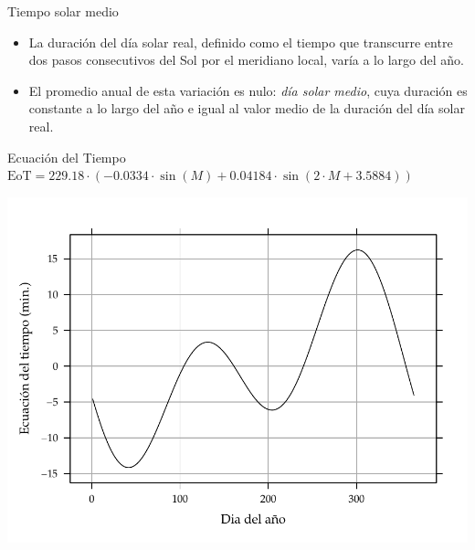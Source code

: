 \documentclass[xcolor={usenames,svgnames,dvipsnames}]{beamer}
\begin{document}
\begin{frame}[label=sec-1-4-3]{Tiempo solar medio}
\begin{itemize}
\item \alert{La duración del día solar real}, definido como el tiempo que
transcurre entre dos pasos consecutivos del Sol por el meridiano
local, \alert{varía a lo largo del año}.

\item El promedio anual de esta variación es nulo: \emph{día solar medio}, cuya
duración es constante a lo largo del año e igual al valor medio de la
duración del día solar real.
\end{itemize}
\end{frame}

\begin{frame}[label=sec-1-4-4]{Ecuación del Tiempo}
$\mathrm{EoT}=229.18\cdot\left(-0.0334\cdot\sin(M)+0.04184\cdot\sin\left(2\cdot
      M+3.5884\right)\right)$

\includegraphics[width=.9\linewidth]{../figs/EoT.pdf}
\end{frame}
\end{document}
